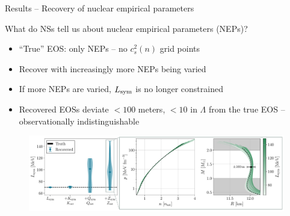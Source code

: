 \documentclass[usenames,dvipsnames,t]{beamer}
\begin{document}
\begin{frame}{Results -- Recovery of nuclear empirical parameters}

  \def\x{3mm}
  \def\y{2mm}

  What do NSs tell us about nuclear empirical parameters (NEPs)?

  \vspace{\y}

  \begin{itemize}
    \item ``True'' EOS: only NEPs -- no $c_s^2(n)$ grid points

    \vspace{\x}

    \item Recover with increasingly more NEPs being varied

    \vspace{\x}

    \item If more NEPs are varied, $L_{\rm{sym}}$ is no longer constrained

    \vspace{\x}
    
    \item Recovered EOSs deviate $<100$ meters, $<10$ in $\Lambda$ from the true EOS -- observationally indistinguishable %
  \end{itemize}

  \begin{figure}
    \centering
    \includegraphics[width=1.0\linewidth]{Figures/money_plot.pdf}
  \end{figure}
\end{frame}
\end{document}
